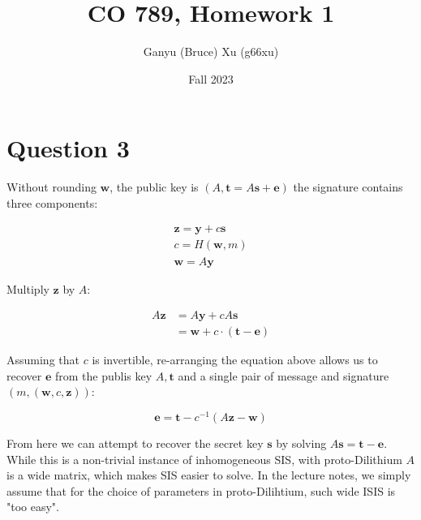 \documentclass{article}
\title{CO 789, Homework 1}
\author{Ganyu (Bruce) Xu (g66xu)}
\date{Fall 2023}
\begin{document}

\section*{Question 3}

Without rounding $\mathbf{w}$, the public key is $(A, \mathbf{t} = A\mathbf{s} + \mathbf{e})$ the signature contains three components:

$$
\begin{aligned}
    \mathbf{z} = \mathbf{y} + c \mathbf{s} \\
    c = H(\mathbf{w}, m) \\
    \mathbf{w} = A\mathbf{y}
\end{aligned}
$$

Multiply $\mathbf{z}$ by $A$:

$$
\begin{aligned}
    A\mathbf{z} &= A\mathbf{y} + c A\mathbf{s} \\
    &= \mathbf{w} + c \cdot (\mathbf{t} - \mathbf{e})
\end{aligned}
$$

Assuming that $c$ is invertible, re-arranging the equation above allows us to recover $\mathbf{e}$ from the publis key $A, \mathbf{t}$ and a single pair of message and signature $(m, (\mathbf{w}, c, \mathbf{z}))$:

$$
\mathbf{e} = \mathbf{t} - c^{-1}(A\mathbf{z} - \mathbf{w})
$$

From here we can attempt to recover the secret key $\mathbf{s}$ by solving $A\mathbf{s} = \mathbf{t} - \mathbf{e}$. While this is a non-trivial instance of inhomogeneous SIS, with proto-Dilithium $A$ is a wide matrix, which makes SIS easier to solve. In the lecture notes, we simply assume that for the choice of parameters in proto-Dilihtium, such wide ISIS is "too easy".
\end{document}
